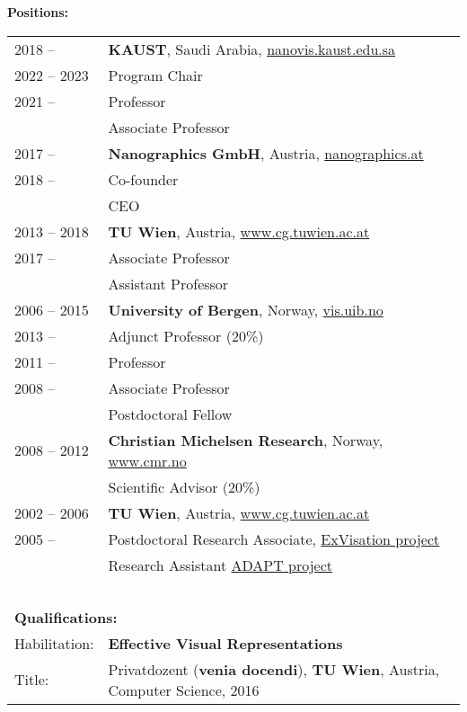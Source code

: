 \documentclass[a4paper,11pt]{letter}
\begin{document}
\textbf{Positions:} \\
\setlength{\tabcolsep}{0.5em}
\begin{tabular}{l|l}
    2018 -- & \textbf{KAUST}, Saudi Arabia, \href{http://nanovis.kaust.edu.sa/}{nanovis.kaust.edu.sa}  \\
2022 -- 2023     & Program Chair\\
2021 --     & Professor\\
     & Associate Professor\\
\hline
    2017 -- & \textbf{Nanographics GmbH}, Austria, \href{http://www.nanographics.at/}{nanographics.at}  \\
     2018 -- & Co-founder\\
     & CEO \\
\hline
    2013 -- 2018 & \textbf{TU Wien}, Austria, \href{http://www.cg.tuwien.ac.ac.at/}{www.cg.tuwien.ac.at}  \\
     2017 -- & Associate Professor \\
     & Assistant Professor\\
\hline
    2006 -- 2015 & \textbf{University of Bergen}, Norway, \href{http://vis.uib.no/}{vis.uib.no} \\
     2013 -- & Adjunct Professor (20\%) \\
     2011 -- & Professor  \\
     2008 -- & Associate Professor \\
     & Postdoctoral Fellow \\
\hline
    2008 -- 2012 & \textbf{Christian Michelsen Research}, Norway, \href{http://www.cmr.no/}{www.cmr.no} \\
      & Scientific Advisor   (20\%)\\
\hline
    2002 -- 2006 & \textbf{TU Wien}, Austria, \href{http://www.cg.tuwien.ac.ac.at/}{www.cg.tuwien.ac.at}  \\
     2005 -- & Postdoctoral Research Associate, \href{http://www.cg.tuwien.ac.at/research/vis/exvisation/}{ExVisation project} \\
     & Research Assistant \href{http://www.cg.tuwien.ac.at/research/vis/adapt/}{ADAPT project} \\
\hline
\multicolumn{2}{l}{~}\\
\multicolumn{2}{l}{\hspace{-0.2cm}\textbf{Qualifications:}} \\
Habilitation:     &  \textbf{Effective Visual Representations} \\
Title: & Privatdozent (\textbf{venia docendi}), \textbf{TU Wien}, Austria, Computer Science, 2016 \\

\end{tabular}
\end{document}
